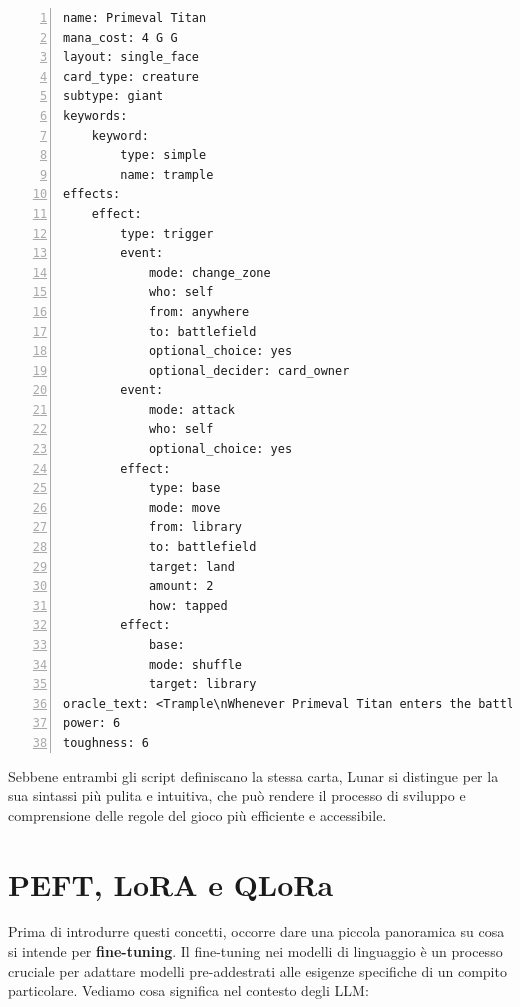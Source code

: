 \begin{algorithm}[!ht]
	\caption{Esempio della carta in Figura \ref{fig:one} in Lunar}
	\label{lst:prime_titan_lunar}
    \footnotesize
	\begin{Verbatim}[numbers=left,breaklines]
name: Primeval Titan
mana_cost: 4 G G
layout: single_face 
card_type: creature
subtype: giant
keywords: 
    keyword:
        type: simple
        name: trample
effects:
    effect:
        type: trigger
        event:
            mode: change_zone
            who: self
            from: anywhere
            to: battlefield
            optional_choice: yes
            optional_decider: card_owner
        event:
            mode: attack
            who: self
            optional_choice: yes
        effect:
            type: base
            mode: move
            from: library
            to: battlefield
            target: land
            amount: 2
            how: tapped
        effect:
            base:
            mode: shuffle
            target: library
oracle_text: <Trample\nWhenever Primeval Titan enters the battlefield or attacks, you may search your library for up to two land cards, put them onto the battlefield tapped, then shuffle.>
power: 6
toughness: 6
	\end{Verbatim}
\end{algorithm}


Sebbene entrambi gli script definiscano la stessa carta, Lunar si distingue per la sua sintassi più pulita e intuitiva, che può rendere il processo di sviluppo e comprensione delle regole del gioco più efficiente e accessibile.
       


\section{PEFT, LoRA e QLoRa}\label{sec:qlora_peft}
Prima di introdurre questi concetti, occorre dare una piccola panoramica su cosa si intende per \textbf{fine-tuning}.
Il fine-tuning nei modelli di linguaggio è un processo cruciale per adattare modelli pre-addestrati alle esigenze specifiche di un compito particolare. Vediamo cosa significa nel contesto degli LLM:

